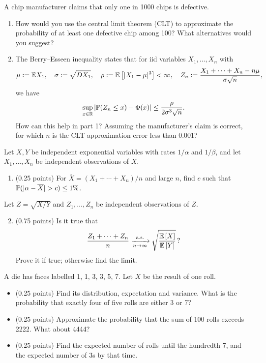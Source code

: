 \documentclass[a4paper]{report}
\begin{document}
\begin{problempencil}
A chip manufacturer claims that only one in 1000 chips is defective.
\begin{enumerate}
\item How would you use the central limit theorem (CLT) to approximate the probability of at least one defective chip among 100? What alternatives would you suggest?
\item The Berry--Esseen inequality states that for iid variables $X_1,\dots,X_n$ with
\[\mu:=\mathbb {E} X_1,\quad\sigma:=\sqrt{DX_1},\quad\rho:=\mathbb {E}\left[ |X_1-\mu|^3\right]<\infty,\quad Z_n:=\frac{X_1+\cdots+X_n-n\mu}{\sigma\sqrt n},\]
we have
\[\sup_{x\in\mathbb R}|\mathbb P(Z_n\le x)-\Phi(x)|\le\frac{\rho}{2\sigma^3\sqrt n}.\]
How can this help in part 1? Assuming the manufacturer's claim is correct, for which $n$ is the CLT approximation error less than 0.001?
\end{enumerate}
\end{problempencil}
\begin{problem}
Let $X,Y$ be independent exponential variables with rates $1/\alpha$ and $1/\beta$, and let $X_1,\dots,X_n$ be independent observations of $X$.
\begin{enumerate}
\item (0.25 points) For $\overline X=(X_1+\cdots+X_n)/n$ and large $n$, find $c$ such that $\P(|\alpha-\overline X|>c)\le1\%$.
\end{enumerate}
Let $Z=\sqrt{X/Y}$ and $Z_1,\dots,Z_n$ be independent observations of $Z$.
\begin{enumerate}\setcounter{enumi}{1}
\item (0.75 points) Is it true that
\[\frac{Z_1+\cdots+Z_n}{n}\xrightarrow[n\to\infty]{\mathrm{a.s.}}\sqrt{\frac{\mathbb {E}\left[ X\right]}{\mathbb {E}\left[ Y\right]}}\,?\]
Prove it if true; otherwise find the limit.
\end{enumerate}
\end{problem}
\begin{problem}
A die has faces labelled 1, 1, 3, 3, 5, 7. Let $X$ be the result of one roll.
\begin{itemize}
\item (0.25 points) Find its distribution, expectation and variance. What is the probability that exactly four of five rolls are either 3 or 7?
\item (0.25 points) Approximate the probability that the sum of 100 rolls exceeds 2222. What about 4444?
\item (0.25 points) Find the expected number of rolls until the hundredth 7, and the expected number of 3s by that time.
\end{itemize}
\end{problem}
\end{document}
